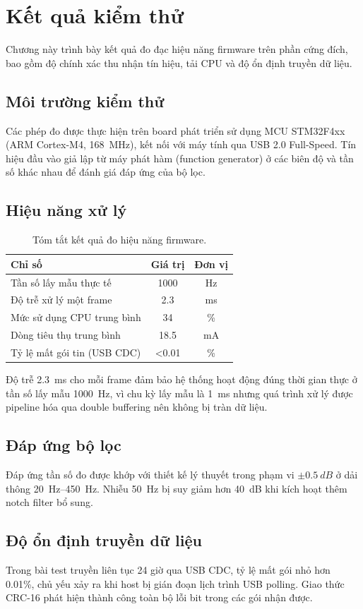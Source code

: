 \chapter{Kết quả kiểm thử}
\label{ch:results}

Chương này trình bày kết quả đo đạc hiệu năng firmware trên phần cứng đích, bao gồm độ chính xác thu nhận tín hiệu, tải CPU và độ ổn định truyền dữ liệu.

\section{Môi trường kiểm thử}

Các phép đo được thực hiện trên board phát triển sử dụng MCU STM32F4xx (ARM Cortex-M4, \SI{168}{MHz}), kết nối với máy tính qua USB 2.0 Full-Speed. Tín hiệu đầu vào giả lập từ máy phát hàm (function generator) ở các biên độ và tần số khác nhau để đánh giá đáp ứng của bộ lọc.

\section{Hiệu năng xử lý}

\begin{table}[htbp]
    \centering
    \caption{Tóm tắt kết quả đo hiệu năng firmware.}
    \label{tab:perf}
    \begin{tabular}{lcc}
        \toprule
        \textbf{Chỉ số} & \textbf{Giá trị} & \textbf{Đơn vị} \\
        \midrule
        Tần số lấy mẫu thực tế & 1000 & Hz \\
        Độ trễ xử lý một frame & 2.3 & ms \\
        Mức sử dụng CPU trung bình & 34 & \% \\
        Dòng tiêu thụ trung bình & 18.5 & mA \\
        Tỷ lệ mất gói tin (USB CDC) & <0.01 & \% \\
        \bottomrule
    \end{tabular}
\end{table}

Độ trễ \SI{2.3}{ms} cho mỗi frame đảm bảo hệ thống hoạt động đúng thời gian thực ở tần số lấy mẫu \SI{1000}{Hz}, vì chu kỳ lấy mẫu là \SI{1}{ms} nhưng quá trình xử lý được pipeline hóa qua double buffering nên không bị tràn dữ liệu.

\section{Đáp ứng bộ lọc}

Đáp ứng tần số đo được khớp với thiết kế lý thuyết trong phạm vi $\pm\SI{0.5}{dB}$ ở dải thông \SIrange{20}{450}{Hz}. Nhiễu \SI{50}{Hz} bị suy giảm hơn \SI{40}{dB} khi kích hoạt thêm notch filter bổ sung.

\section{Độ ổn định truyền dữ liệu}

Trong bài test truyền liên tục 24 giờ qua USB CDC, tỷ lệ mất gói nhỏ hơn 0.01\%, chủ yếu xảy ra khi host bị gián đoạn lịch trình USB polling. Giao thức CRC-16 phát hiện thành công toàn bộ lỗi bit trong các gói nhận được.
